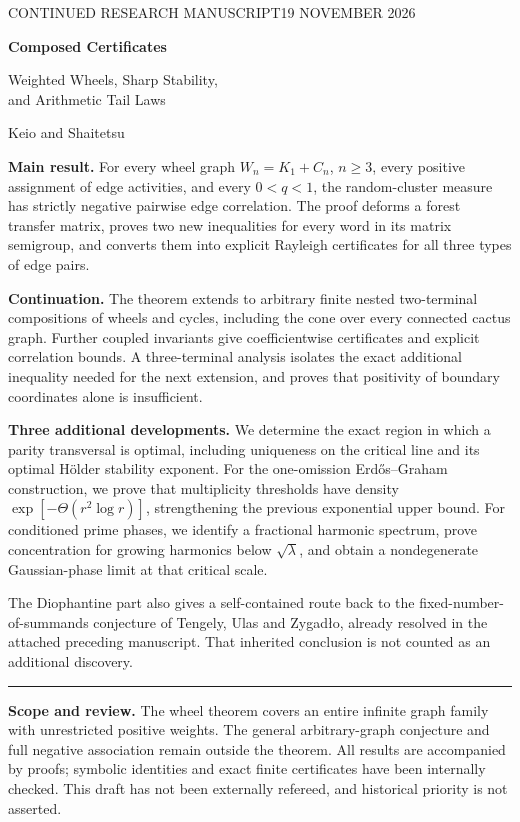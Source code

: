 \documentclass[11pt,a4paper]{article}
\theoremstyle{definition}
\theoremstyle{remark}\newtheorem{remark}[theorem]{Remark}
\begin{document}
\begin{titlepage}
\color{navy}
{\small\sffamily CONTINUED RESEARCH MANUSCRIPT\hfill 19 NOVEMBER 2026}\par
\vspace{17mm}
{\LARGE\bfseries Composed Certificates}\par
\vspace{5mm}
{\Large Weighted Wheels, Sharp Stability,\\[3pt]
and Arithmetic Tail Laws}\par
\vspace{6mm}
{\large Keio and Shaitetsu}\par
\vspace{10mm}
\color{black}
\textbf{Main result.} For every wheel graph $W_n=K_1+C_n$, $n\ge3$,
every positive assignment of edge activities, and every $0<q<1$, the
random-cluster measure has strictly negative pairwise edge correlation.
The proof deforms a forest transfer matrix, proves two new inequalities
for every word in its matrix semigroup, and converts them into explicit
Rayleigh certificates for all three types of edge pairs.

\medskip
\textbf{Continuation.} The theorem extends to arbitrary finite nested
two-terminal compositions of wheels and cycles, including the cone over
every connected cactus graph. Further coupled invariants give
coefficientwise certificates and explicit correlation bounds. A
three-terminal analysis isolates the exact additional inequality needed
for the next extension, and proves that positivity of boundary
coordinates alone is insufficient.

\medskip
\textbf{Three additional developments.} We determine the exact region in
which a parity transversal is optimal, including uniqueness on the critical
line and its optimal H\"older stability exponent. For the one-omission
Erd\H{o}s--Graham construction, we prove that multiplicity thresholds have
density $\exp[-\Theta(r^2\log r)]$, strengthening the previous exponential
upper bound. For conditioned prime phases, we identify a fractional
harmonic spectrum, prove concentration for growing harmonics below
$\sqrt\lambda$, and obtain a nondegenerate Gaussian-phase limit at that
critical scale.

\medskip
The Diophantine part also gives a self-contained route back to the
fixed-number-of-summands conjecture of Tengely, Ulas and Zygad\l{}o,
already resolved in the attached preceding manuscript. That inherited
conclusion is not counted as an additional discovery.

\vfill
{\color{teal}\rule{\textwidth}{1.2pt}}\par
\small
\textbf{Scope and review.} The wheel theorem covers an entire infinite
graph family with unrestricted positive weights. The general
arbitrary-graph conjecture and full negative association remain outside
the theorem. All results are accompanied by proofs; symbolic identities
and exact finite certificates have been internally checked. This draft
has not been externally refereed, and historical priority is not asserted.
\end{titlepage}
\setcounter{page}{2}
\end{document}
